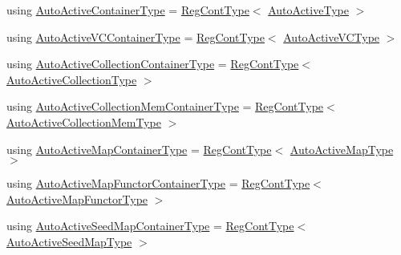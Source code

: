 \begin{DoxyCompactItemize}
\item 
using \hyperlink{namespacevt_1_1auto__registry_a08dc8b065a2c2fd466ae6299eb9ca6b9}{Auto\+Active\+Container\+Type} = \hyperlink{namespacevt_1_1auto__registry_a988a4943e4c8fe82b56f5b13bddceb2b}{Reg\+Cont\+Type}$<$ \hyperlink{namespacevt_1_1auto__registry_a2c91a60d4d3c0d80a563c3d4f54162eb}{Auto\+Active\+Type} $>$
\item 
using \hyperlink{namespacevt_1_1auto__registry_a39e866b6d2db660ab9cd9f7cacfa5595}{Auto\+Active\+V\+C\+Container\+Type} = \hyperlink{namespacevt_1_1auto__registry_a988a4943e4c8fe82b56f5b13bddceb2b}{Reg\+Cont\+Type}$<$ \hyperlink{namespacevt_1_1auto__registry_a3e4aadbe33ef7af6d8b87f72876aee41}{Auto\+Active\+V\+C\+Type} $>$
\item 
using \hyperlink{namespacevt_1_1auto__registry_a6d9b82aa23fd781ab64b6b4e55a4c94f}{Auto\+Active\+Collection\+Container\+Type} = \hyperlink{namespacevt_1_1auto__registry_a988a4943e4c8fe82b56f5b13bddceb2b}{Reg\+Cont\+Type}$<$ \hyperlink{namespacevt_1_1auto__registry_a14267fe1eee84b3f2205aecac48cafe4}{Auto\+Active\+Collection\+Type} $>$
\item 
using \hyperlink{namespacevt_1_1auto__registry_a2843152c64eb58ed89991d1d2ae2c3f1}{Auto\+Active\+Collection\+Mem\+Container\+Type} = \hyperlink{namespacevt_1_1auto__registry_a988a4943e4c8fe82b56f5b13bddceb2b}{Reg\+Cont\+Type}$<$ \hyperlink{namespacevt_1_1auto__registry_af5d102e15ae09e22dbc560f5b64ec758}{Auto\+Active\+Collection\+Mem\+Type} $>$
\item 
using \hyperlink{namespacevt_1_1auto__registry_a9c5b8f15bca7b0ca4d56cae7c9f85d12}{Auto\+Active\+Map\+Container\+Type} = \hyperlink{namespacevt_1_1auto__registry_a988a4943e4c8fe82b56f5b13bddceb2b}{Reg\+Cont\+Type}$<$ \hyperlink{namespacevt_1_1auto__registry_ae1bc8f9afc86cc589761fbbf22064601}{Auto\+Active\+Map\+Type} $>$
\item 
using \hyperlink{namespacevt_1_1auto__registry_a531e799a0af154cbf069df74aec0f765}{Auto\+Active\+Map\+Functor\+Container\+Type} = \hyperlink{namespacevt_1_1auto__registry_a988a4943e4c8fe82b56f5b13bddceb2b}{Reg\+Cont\+Type}$<$ \hyperlink{namespacevt_1_1auto__registry_a05a587ebd105ed89932361888de7e4ae}{Auto\+Active\+Map\+Functor\+Type} $>$
\item 
using \hyperlink{namespacevt_1_1auto__registry_ab66be9508a849981974eb0c5f9909ff4}{Auto\+Active\+Seed\+Map\+Container\+Type} = \hyperlink{namespacevt_1_1auto__registry_a988a4943e4c8fe82b56f5b13bddceb2b}{Reg\+Cont\+Type}$<$ \hyperlink{namespacevt_1_1auto__registry_a9b5f3bdf0a9a503806cfd4f2747c82f6}{Auto\+Active\+Seed\+Map\+Type} $>$

\end{DoxyCompactItemize}
